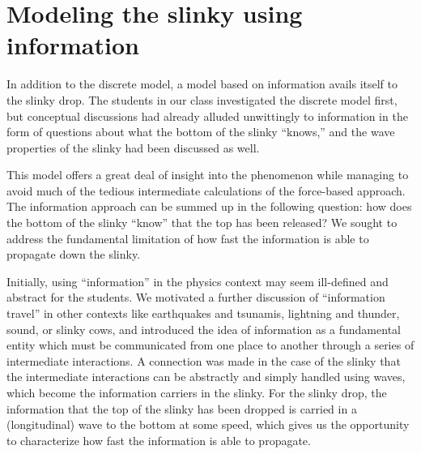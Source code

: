 \documentclass[prb,preprint,superscriptaddress]{revtex4-1}
\begin{document}
\section{Modeling the slinky using information}
\label{sec:information}

In addition to the discrete model, a model based on information avails itself to
the slinky drop.
The students in our class investigated the discrete model first, but
conceptual discussions had already alluded
unwittingly to information in the form of questions about
what the bottom of the slinky ``knows,'' and the wave properties
of the slinky had been discussed as well.

This model offers a great deal of insight into the phenomenon while
managing to avoid much of the tedious intermediate calculations of the force-based
approach. The information approach can be summed up in the following question:
how does the bottom of the slinky ``know'' that the top has been released? We sought
to address the fundamental limitation of how fast the information is able to propagate
down the slinky.

Initially, using ``information'' in the physics context may seem ill-defined and
abstract for the students.
We motivated a further discussion of ``information travel'' in other contexts
like earthquakes and tsunamis, 
lightning and thunder, sound, or slinky cows,
and introduced the idea of information as a fundamental entity which must be
communicated from one place to another through a series of intermediate interactions.
A connection was made in the case of the slinky that the intermediate interactions
can be abstractly and simply handled using waves, which become the information
carriers in the slinky.
For the slinky drop,
the information that the top of the slinky has been dropped is carried in a (longitudinal) wave to the bottom
at some speed, which gives us the opportunity to characterize how fast the
information is able to propagate.
\end{document}
